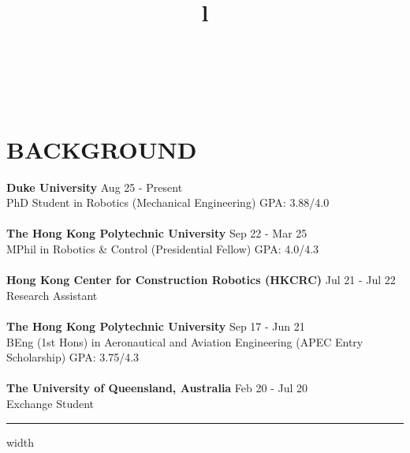 \documentclass[overlapped]{res}
\begin{document}
\begin{resume}

\begin{format}
  \title{l}\\
  \body\\
\end{format}

\section{BACKGROUND}
\textbf{Duke University} \hfill Aug \textquotesingle{}25 - Present\\
PhD Student in Robotics (Mechanical Engineering) \hfill GPA: 3.88/4.0
\\\\
\textbf{The Hong Kong Polytechnic University} \hfill Sep \textquotesingle{}22 - Mar \textquotesingle{}25\\
MPhil in Robotics \& Control (Presidential Fellow) \hfill GPA: 4.0/4.3
\\ \\ 
\textbf{Hong Kong Center for Construction Robotics (HKCRC)} \hfill Jul \textquotesingle{}21 - Jul \textquotesingle{}22\\
Research Assistant
\\\\
\textbf{The Hong Kong Polytechnic University} \hfill Sep \textquotesingle{}17 - Jun \textquotesingle{}21\\
BEng (1st Hons) in Aeronautical and Aviation Engineering (APEC Entry Scholarship) \hfill GPA: 3.75/4.3
\\\\
\textbf{The University of Queensland, Australia} \hfill Feb \textquotesingle{}20 - Jul \textquotesingle{}20\\
Exchange Student
\par\noindent\hrule width \linewidth %


\end{resume}
\end{document}
